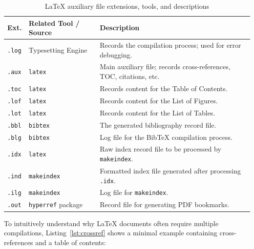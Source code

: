 \begin{table}[htbp]
    \centering
    \small
    \setlength{\tabcolsep}{3pt}
    \caption{\LaTeX{} auxiliary file extensions, tools, and descriptions}
    \label{tab:latex-aux}
    \begin{tabular}{p{1cm}p{2.2cm}p{3.6cm}}
        \toprule
        \textbf{Ext.} & \textbf{Related Tool / Source} & \textbf{Description}                                                \\
        \midrule
        \texttt{.log}      & Typesetting Engine             & Records the compilation process; used for error debugging.          \\
        \texttt{.aux}      & \texttt{latex}                 & Main auxiliary file; records cross-references, TOC, citations, etc. \\
        \texttt{.toc}      & \texttt{latex}                 & Records content for the Table of Contents.                          \\
        \texttt{.lof}      & \texttt{latex}                 & Records content for the List of Figures.                            \\
        \texttt{.lot}      & \texttt{latex}                 & Records content for the List of Tables.                             \\
        \texttt{.bbl}      & \texttt{bibtex}                & The generated bibliography record file.                             \\
        \texttt{.blg}      & \texttt{bibtex}                & Log file for the BibTeX compilation process.                        \\
        \texttt{.idx}      & \texttt{latex}                 & Raw index record file to be processed by \texttt{makeindex}.        \\
        \texttt{.ind}      & \texttt{makeindex}             & Formatted index file generated after processing \texttt{.idx}.      \\
        \texttt{.ilg}      & \texttt{makeindex}             & Log file for \texttt{makeindex}.                                    \\
        \texttt{.out}      & \texttt{hyperref} package      & Record file for generating PDF bookmarks.                           \\
        \bottomrule
    \end{tabular}
\end{table}

To intuitively understand why \LaTeX{} documents often require multiple compilations, Listing~\ref{lst:crossref} shows a minimal example containing cross-references and a table of contents:

